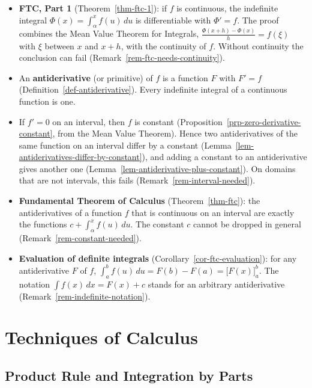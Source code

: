 \documentclass[
  letterpaper,
  DIV=11,
  numbers=noendperiod]{scrreprt}
\providecommand{\tightlist}{%
  \setlength{\itemsep}{0pt}\setlength{\parskip}{0pt}}
\theoremstyle{plain}
\theoremstyle{plain}
\theoremstyle{definition}
\theoremstyle{definition}
\theoremstyle{definition}
\theoremstyle{plain}
\theoremstyle{plain}
\theoremstyle{remark}
\begin{document}
\begin{itemize}
\tightlist
\item
  \textbf{FTC, Part 1} (Theorem~\ref{thm-ftc-1}): if \(f\) is
  continuous, the indefinite integral \(\Phi(x)=\int_\alpha^x f(u)\,du\)
  is differentiable with \(\Phi'=f\). The proof combines the Mean Value
  Theorem for Integrals, \(\frac{\Phi(x+h)-\Phi(x)}{h} = f(\xi)\) with
  \(\xi\) between \(x\) and \(x+h\), with the continuity of \(f\).
  Without continuity the conclusion can fail
  (Remark~\ref{rem-ftc-needs-continuity}).
\item
  An \textbf{antiderivative} (or primitive) of \(f\) is a function \(F\)
  with \(F'=f\) (Definition~\ref{def-antiderivative}). Every indefinite
  integral of a continuous function is one.
\item
  If \(f'=0\) on an interval, then \(f\) is constant
  (Proposition~\ref{prp-zero-derivative-constant}, from the Mean Value
  Theorem). Hence two antiderivatives of the same function on an
  interval differ by a constant
  (Lemma~\ref{lem-antiderivatives-differ-by-constant}), and adding a
  constant to an antiderivative gives another one
  (Lemma~\ref{lem-antiderivative-plus-constant}). On domains that are
  not intervals, this fails (Remark~\ref{rem-interval-needed}).
\item
  \textbf{Fundamental Theorem of Calculus} (Theorem~\ref{thm-ftc}): the
  antiderivatives of a function \(f\) that is continuous on an interval
  are exactly the functions \(c + \int_\alpha^x f(u)\,du\). The constant
  \(c\) cannot be dropped in general (Remark~\ref{rem-constant-needed}).
\item
  \textbf{Evaluation of definite integrals}
  (Corollary~\ref{cor-ftc-evaluation}): for any antiderivative \(F\) of
  \(f\), \(\int_a^b f(u)\,du = F(b)-F(a) = \big[F(x)\big]_a^b\). The
  notation \(\int f(x)\,dx = F(x)+c\) stands for an arbitrary
  antiderivative (Remark~\ref{rem-indefinite-notation}).
\end{itemize}

\part{Techniques of Calculus}

\chapter{Product Rule and Integration by
Parts}\label{product-rule-and-integration-by-parts}
\end{document}
